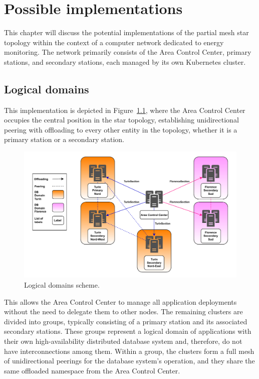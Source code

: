 \chapter{Possible implementations}
This chapter will discuss the potential implementations of the partial mesh star topology within the context of a computer network dedicated to energy monitoring. The network primarily consists of the Area Control Center, primary stations, and secondary stations, each managed by its own Kubernetes cluster.

\section{Logical domains}
This implementation is depicted in Figure~\ref{fig:domains}, where the Area Control Center occupies the central position in the star topology, establishing unidirectional peering with offloading to every other entity in the topology, whether it is a primary station or a secondary station.

\begin{figure}[ht]\centering
\includegraphics[scale=0.7]{Pictures/Domain-v3}
\caption{Logical domains scheme.}\label{fig:domains}
\end{figure}

This allows the Area Control Center to manage all application deployments without the need to delegate them to other nodes.
The remaining clusters are divided into groups, typically consisting of a primary station and its associated secondary stations. These groups represent a logical domain of applications with their own high-availability distributed database system and, therefore, do not have interconnections among them. Within a group, the clusters form a full mesh of unidirectional peerings for the database system's operation, and they share the same offloaded namespace from the Area Control Center. 


